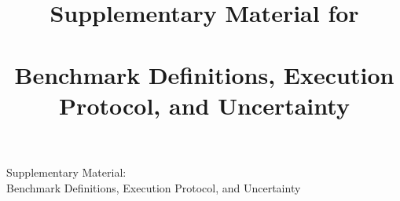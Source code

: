 \ifdefined\papertitle\else

\fi
\ifdefined\manuscriptwithsupplement
\clearpage
\begingroup
\normalsize
\setcounter{section}{0}
\setcounter{table}{0}
\setcounter{figure}{0}
\setcounter{equation}{0}
\renewcommand{\thesection}{S\arabic{section}}
\renewcommand{\thetable}{S\arabic{table}}
\renewcommand{\thefigure}{S\arabic{figure}}
\renewcommand{\theequation}{S\arabic{equation}}
\renewcommand{\theHsection}{supp.\arabic{section}}
\renewcommand{\theHtable}{supp.\arabic{table}}
\renewcommand{\theHfigure}{supp.\arabic{figure}}
\renewcommand{\theHequation}{supp.\arabic{equation}}
\setlength{\emergencystretch}{2em}
\begin{center}
{\LARGE Supplementary Material:\\Benchmark Definitions, Execution Protocol, and Uncertainty\par}
\medskip
{\large \papertitle\par}
\medskip
\paperauthors
\end{center}
\else
\documentclass{article}
\usepackage[T1]{fontenc}
\usepackage[utf8]{inputenc}
\usepackage[letterpaper,margin=1in]{geometry}
\usepackage{amsmath,amssymb,booktabs,placeins,xurl}
\usepackage{longtable,pdflscape,graphicx,makecell,multirow}
\usepackage{threeparttable}
\renewcommand{\thefigure}{S\arabic{figure}}
\usepackage[authoryear,round,sort]{natbib}
\usepackage[hidelinks]{hyperref}
\usepackage{xcolor}
\providecommand{\david}[1]{\textcolor{red}{D: #1}}
\providecommand{\albert}[1]{\textcolor{blue}{A: #1}}
\providecommand{\claude}[1]{\textcolor{teal}{C: #1}}
\renewcommand{\thetable}{S\arabic{table}}
\renewcommand{\theequation}{S\arabic{equation}}
\renewcommand{\thesection}{S\arabic{section}}
\setlength{\emergencystretch}{2em}
\title{Supplementary Material for\\\papertitle\\[1ex]\large Benchmark Definitions, Execution Protocol, and Uncertainty}
\author{\paperauthors}
\date{}
\setlength{\emergencystretch}{2em}

\maketitle
\vspace{-2em}
\fi
The Grid-GDP functions are adapted from the Quantum Hamiltonian Descent collection; each instance is defined by the expression and domain implemented there, which can differ from other functions known by the same name~\citep{qhdBenchmarks,rbfoptTestArchive}.

